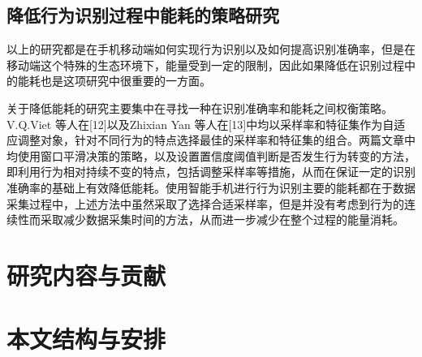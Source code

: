 \subsection{降低行为识别过程中能耗的策略研究}
\par 以上的研究都是在手机移动端如何实现行为识别以及如何提高识别准确率，但是在移动端这个特殊的生态环境下，能量受到一定的限制，因此如果降低在识别过程中的能耗也是这项研究中很重要的一方面。
\par 关于降低能耗的研究主要集中在寻找一种在识别准确率和能耗之间权衡策略。V.Q.Viet 等人在[12]以及Zhixian Yan 等人在[13]中均以采样率和特征集作为自适应调整对象，针对不同行为的特点选择最佳的采样率和特征集的组合。两篇文章中均使用窗口平滑决策的策略，以及设置置信度阈值判断是否发生行为转变的方法，即利用行为相对持续不变的特点，包括调整采样率等措施，从而在保证一定的识别准确率的基础上有效降低能耗。使用智能手机进行行为识别主要的能耗都在于数据采集过程中，上述方法中虽然采取了选择合适采样率，但是并没有考虑到行为的连续性而采取减少数据采集时间的方法，从而进一步减少在整个过程的能量消耗。


\section{研究内容与贡献}

\section{本文结构与安排}